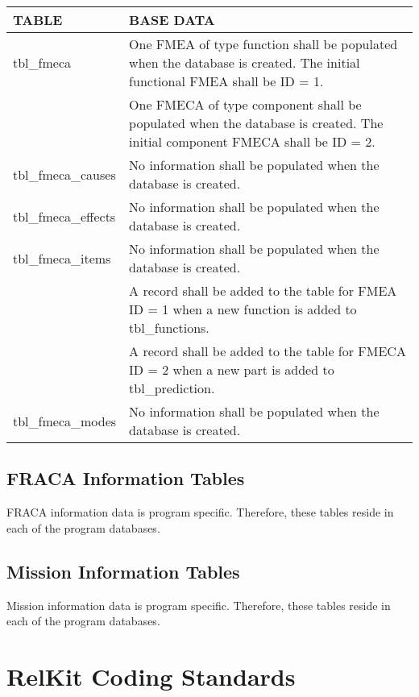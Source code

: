 \documentclass[11pt, 12pt, twoside, onecolumn]{article}
\begin{document}
    \begin{landscape}
    \begin{longtable}{ll}
    TABLE & BASE DATA \\
    \hline
    tbl\_fmeca & One FMEA of type function shall be populated when the database is created. The initial functional FMEA shall be ID = 1. \\
    & One FMECA of type component shall be populated when the database is created.  The initial component FMECA shall be ID = 2. \\
    tbl\_fmeca\_causes & No information shall be populated when the database is created. \\
    tbl\_fmeca\_effects & No information shall be populated when the database is created. \\
    tbl\_fmeca\_items & No information shall be populated when the database is created. \\
    & A record shall be added to the table for FMEA ID = 1 when a new function is added to tbl\_functions. \\
    & A record shall be added to the table for FMECA ID = 2 when a new part is added to tbl\_prediction. \\
    tbl\_fmeca\_modes & No information shall be populated when the database is created. \\
    \hline
    \end{longtable}
    \end{landscape}

\subsection{\bf \large FRACA Information Tables}

\noindent FRACA information data is program specific.  Therefore, these tables reside in each of the program databases.

\subsection{\bf \large Mission Information Tables}

\noindent Mission information data is program specific.  Therefore, these tables reside in each of the program databases.

\section{\bf \Large RelKit Coding Standards}
\end{document}
